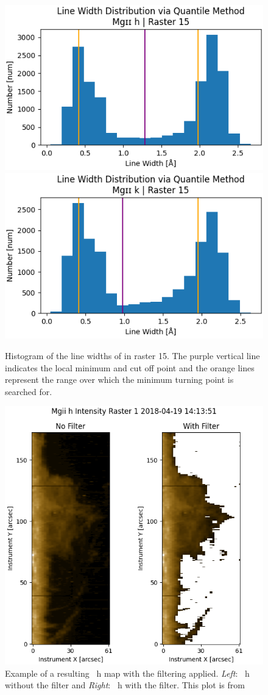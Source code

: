 \begin{figure}
    \centering
    \includegraphics[width=0.49\linewidth]{./01Observations/figs/h15.png}
    \includegraphics[width=0.49\linewidth]{./01Observations/figs/k15.png}
    \caption[Histogram of the line widths of \mgiihk{} in raster 15.]{Histogram of the line widths of \mgiihk{} in raster 15. The purple vertical line indicates the local minimum and cut off point and the orange lines represent the range over which the minimum turning point is searched for.}
    \label{lwHist}
\end{figure}

\begin{figure}
    \centering
    \includegraphics[width=0.6\linewidth]{./01Observations/figs/20180419/Figure_2.png}
    \caption[Example of a resulting \mgii~h map with the filtering applied.]{Example of a resulting \mgii~h map with the filtering applied. \textit{Left}: \mgii~h without the filter and \textit{Right}: \mgii~h with the filter. This plot is from \cite{peat_solar_2021}}
    \label{filtresult}
\end{figure}



